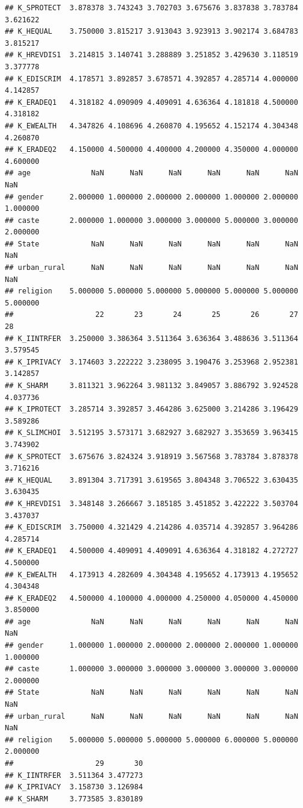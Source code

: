 \documentclass[
]{article}
\begin{document}
\begin{verbatim}
## K_SPROTECT  3.878378 3.743243 3.702703 3.675676 3.837838 3.783784 3.621622
## K_HEQUAL    3.750000 3.815217 3.913043 3.923913 3.902174 3.684783 3.815217
## K_HREVDIS1  3.214815 3.140741 3.288889 3.251852 3.429630 3.118519 3.377778
## K_EDISCRIM  4.178571 3.892857 3.678571 4.392857 4.285714 4.000000 4.142857
## K_ERADEQ1   4.318182 4.090909 4.409091 4.636364 4.181818 4.500000 4.318182
## K_EWEALTH   4.347826 4.108696 4.260870 4.195652 4.152174 4.304348 4.260870
## K_ERADEQ2   4.150000 4.500000 4.400000 4.200000 4.350000 4.000000 4.600000
## age              NaN      NaN      NaN      NaN      NaN      NaN      NaN
## gender      2.000000 1.000000 2.000000 2.000000 1.000000 2.000000 1.000000
## caste       2.000000 1.000000 3.000000 3.000000 5.000000 3.000000 2.000000
## State            NaN      NaN      NaN      NaN      NaN      NaN      NaN
## urban_rural      NaN      NaN      NaN      NaN      NaN      NaN      NaN
## religion    5.000000 5.000000 5.000000 5.000000 5.000000 5.000000 5.000000
##                   22       23       24       25       26       27       28
## K_IINTRFER  3.250000 3.386364 3.511364 3.636364 3.488636 3.511364 3.579545
## K_IPRIVACY  3.174603 3.222222 3.238095 3.190476 3.253968 2.952381 3.142857
## K_SHARM     3.811321 3.962264 3.981132 3.849057 3.886792 3.924528 4.037736
## K_IPROTECT  3.285714 3.392857 3.464286 3.625000 3.214286 3.196429 3.589286
## K_SLIMCHOI  3.512195 3.573171 3.682927 3.682927 3.353659 3.963415 3.743902
## K_SPROTECT  3.675676 3.824324 3.918919 3.567568 3.783784 3.878378 3.716216
## K_HEQUAL    3.891304 3.717391 3.619565 3.804348 3.706522 3.630435 3.630435
## K_HREVDIS1  3.348148 3.266667 3.185185 3.451852 3.422222 3.503704 3.437037
## K_EDISCRIM  3.750000 4.321429 4.214286 4.035714 4.392857 3.964286 4.285714
## K_ERADEQ1   4.500000 4.409091 4.409091 4.636364 4.318182 4.272727 4.500000
## K_EWEALTH   4.173913 4.282609 4.304348 4.195652 4.173913 4.195652 4.304348
## K_ERADEQ2   4.500000 4.100000 4.000000 4.250000 4.050000 4.450000 3.850000
## age              NaN      NaN      NaN      NaN      NaN      NaN      NaN
## gender      1.000000 1.000000 2.000000 2.000000 2.000000 1.000000 1.000000
## caste       1.000000 3.000000 3.000000 3.000000 3.000000 3.000000 2.000000
## State            NaN      NaN      NaN      NaN      NaN      NaN      NaN
## urban_rural      NaN      NaN      NaN      NaN      NaN      NaN      NaN
## religion    5.000000 5.000000 5.000000 5.000000 6.000000 5.000000 2.000000
##                   29       30
## K_IINTRFER  3.511364 3.477273
## K_IPRIVACY  3.158730 3.126984
## K_SHARM     3.773585 3.830189

\end{verbatim}
\end{document}
